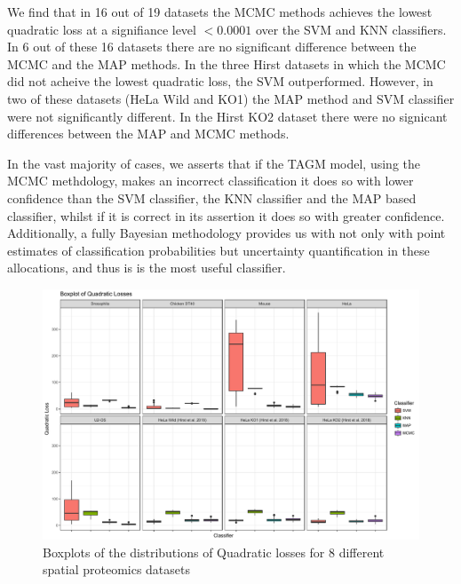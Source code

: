 \documentclass[12pt,english]{article}
\begin{document}
We find that in 16 out of 19  datasets the MCMC methods achieves the lowest quadratic loss at a signifiance level $<0.0001$ over the SVM and KNN classifiers. In 6 out of these 16 datasets there are no significant
difference between the MCMC and the MAP methods. In the three Hirst datasets in which the MCMC did not acheive
the lowest quadratic loss, the SVM outperformed. However, in two of these datasets (HeLa Wild and KO1) the MAP method and SVM classifier were not significantly different. In the Hirst KO2 dataset there were no signicant differences between the MAP and MCMC methods.

In the vast majority of cases, we asserts that if the TAGM model, using the MCMC methdology, makes an incorrect classification it does so with lower confidence than the SVM classifier, the KNN classifier and the MAP based classifier, whilst if it is correct in its assertion it does so with greater confidence. Additionally, a fully Bayesian methodology provides us with not only with point estimates of classification probabilities but uncertainty quantification in these allocations, and thus is is the most useful classifier.


\begin{figure}[ht]
  \centering
\includegraphics[width=\textwidth]{Quadlosscompare1.pdf}
  \caption{Boxplots of the distributions of Quadratic losses
    for 8 different spatial proteomics datasets}
  \label{figure::quadloss1}
\end{figure}
\end{document}
